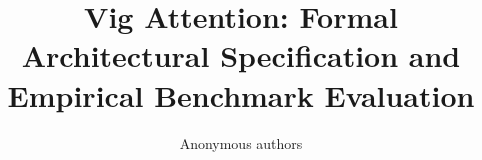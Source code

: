 \title{\textbf{Vig Attention: Formal Architectural Specification and Empirical Benchmark Evaluation}}

\author{Anonymous authors}
